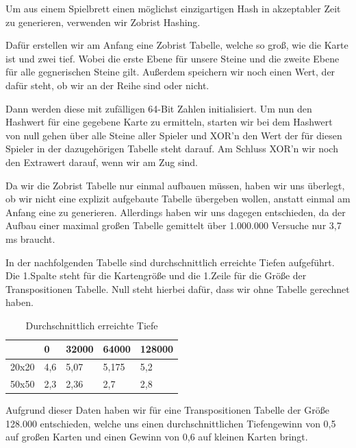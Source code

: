 \documentclass[12pt,a4paper,bibliography=totocnumbered,listof=totocnumbered]{article}
\begin{document}
Um aus einem Spielbrett einen möglichst einzigartigen Hash in akzeptabler Zeit zu generieren, verwenden wir Zobrist Hashing.

Dafür erstellen wir am Anfang eine Zobrist Tabelle, welche so groß, wie die Karte ist und zwei tief. Wobei die erste Ebene für unsere Steine und die zweite Ebene für alle gegnerischen Steine gilt. Außerdem speichern wir noch einen Wert, der dafür steht, ob wir an der Reihe sind oder nicht.

Dann werden diese mit zufälligen 64-Bit Zahlen initialisiert.
Um nun den Hashwert für eine gegebene Karte zu ermitteln, starten wir bei dem Hashwert von null gehen über alle Steine aller Spieler und XOR'n den Wert der für diesen Spieler in der dazugehörigen Tabelle steht darauf. Am Schluss XOR'n wir noch den Extrawert darauf, wenn wir am Zug sind.

Da wir die Zobrist Tabelle nur einmal aufbauen müssen, haben wir uns überlegt, ob wir nicht eine explizit aufgebaute Tabelle übergeben wollen, anstatt einmal am Anfang eine zu generieren.
Allerdings haben wir uns dagegen entschieden, da der Aufbau einer maximal großen Tabelle gemittelt über 1.000.000 Versuche nur 3,7 ms braucht.

In der nachfolgenden Tabelle sind durchschnittlich erreichte Tiefen aufgeführt. Die 1.Spalte steht für die Kartengröße und die 1.Zeile für die Größe der Transpositionen Tabelle. Null steht hierbei dafür, dass wir ohne Tabelle gerechnet haben.

\begin{table}[!h]
\centering
	\begin{tabular} {| m{1.7cm} | m{3cm} | m{3cm} | m{3cm} | m{3cm}|}
		\hline
		\textbf{} &\textbf{0} &\textbf{32000} & \textbf{64000} & \textbf{128000}\\
		\hline
		20x20 & 4,6 & 5,07 & 5,175 & 5,2 \\
		\hline
		50x50 & 2,3 & 2,36 & 2,7 & 2,8 \\
		\hline
	\end{tabular}
	\caption{Durchschnittlich erreichte Tiefe}
	\label{tab:tasks}
\end{table}

Aufgrund dieser Daten haben wir für eine Transpositionen Tabelle der Größe 128.000 entschieden, welche uns einen durchschnittlichen Tiefengewinn von 0,5 auf großen Karten und einen Gewinn von 0,6 auf kleinen Karten bringt.



\newpage
\end{document}
